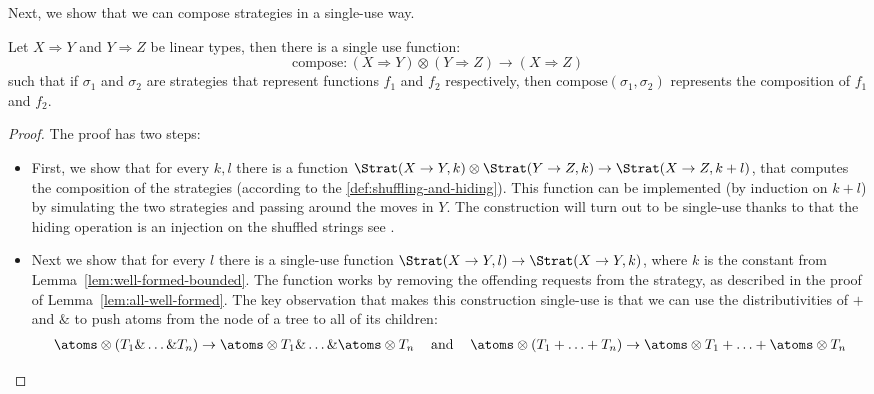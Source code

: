 Next, we show that we can compose strategies in a single-use way. 
\begin{lemma}\label{lem:compose-single-use-linear-type}
    Let $X \Rightarrow Y$ and $Y \Rightarrow Z$ be linear types, then there is a single use function:
    \[\text{compose} : (X \Rightarrow Y) \otimes (Y \Rightarrow Z) \to (X \Rightarrow Z)\]
    such that if $\sigma_1$ and $\sigma_2$ are strategies that represent functions $f_1$ and $f_2$ respectively,
    then $\text{compose}(\sigma_1, \sigma_2)$ represents the composition of $f_1$ and $f_2$.
\end{lemma}
\begin{proof}
    The proof has two steps:
    \begin{itemize}
        \item First, we show that for every $k, l$ there is a function
              $\Strat(X \to Y, k) \otimes \Strat(Y \to Z, k) \to \Strat(X \to Z, k + l)$, 
              that computes the composition of the strategies (according to the \ref{def:shuffling-and-hiding}). 
              This function can be implemented (by induction on $k + l$) by simulating the two strategies 
              and passing around the moves in $Y$. The construction will turn out to be single-use 
              thanks to that the hiding operation is an injection on 
              the shuffled strings see \cite[Covering Lemma]{abramsky2013semantics}.
        \item Next we show that for every $l$ there is a single-use function 
              $\Strat(X \to Y, l) \to \Strat(X \to Y, k)$, where $k$ is the 
              constant from Lemma~\ref{lem:well-formed-bounded}.
              The function works by removing the offending requests from the 
              strategy, as described in the proof of Lemma~\ref{lem:all-well-formed}. The key observation that makes this construction single-use is that we can use the 
              distributivities of $+$ and $\&$ to push atoms from the node 
              of a tree to all of its children:
              \[
                \begin{tabular}{ccc}
                    $ \atoms \otimes (T_1 \& \ldots \& T_n) \to \atoms \otimes T_1 \& \ldots \& \atoms \otimes T_n$ & and &
                    $ \atoms \otimes (T_1 +  \ldots + T_n) \to \atoms \otimes T_1 + \ldots + \atoms \otimes T_n$
                \end{tabular}
              \]
    \end{itemize}
\end{proof}

